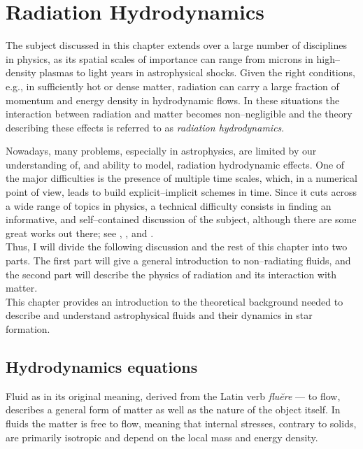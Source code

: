 \chapter{Radiation Hydrodynamics} %
\label{Chapter2} %

The subject discussed in this chapter extends over a large number of disciplines in physics, as its spatial scales of importance can range from microns in high--density plasmas to light years in astrophysical shocks.
Given the right conditions, e.g., in sufficiently hot or dense matter, radiation can carry a large fraction of momentum and energy density in hydrodynamic flows.
In these situations the interaction between radiation and matter becomes non--negligible and the theory describing these effects is referred to as \textit{radiation hydrodynamics}.

Nowadays, many problems, especially in astrophysics, are limited by our understanding of, and ability to model, radiation hydrodynamic effects.
One of the major difficulties is the presence of multiple time scales, which, in a numerical point of view, leads to build explicit--implicit schemes in time.
Since it cuts across a wide range of topics in physics, a technical difficulty consists in finding an informative, and self--contained discussion of the subject, although there are some great works out there; see \citet{Mihalas}, \citet{Rybicki_Lightman}, \citet{Shu_1} and \citet{Castor}.
\\[6pt]
%
Thus, I will divide the following discussion and the rest of this chapter into two parts.
The first part will give a general introduction to non--radiating fluids, and the second part will describe the physics of radiation and its interaction with matter.
\\[6pt]
%
This chapter provides an introduction to the theoretical background needed to describe and understand astrophysical fluids and their dynamics in star formation.


\section{Hydrodynamics equations}
\label{sec:HydrodynamicEquations}
Fluid as in its original meaning, derived from the Latin verb \textit{flu\u{e}re} --- to flow, describes a general form of matter as well as the nature of the object itself.
In fluids the matter is free to flow, meaning that internal stresses, contrary to solids, are primarily isotropic and depend on the local mass and energy density.

